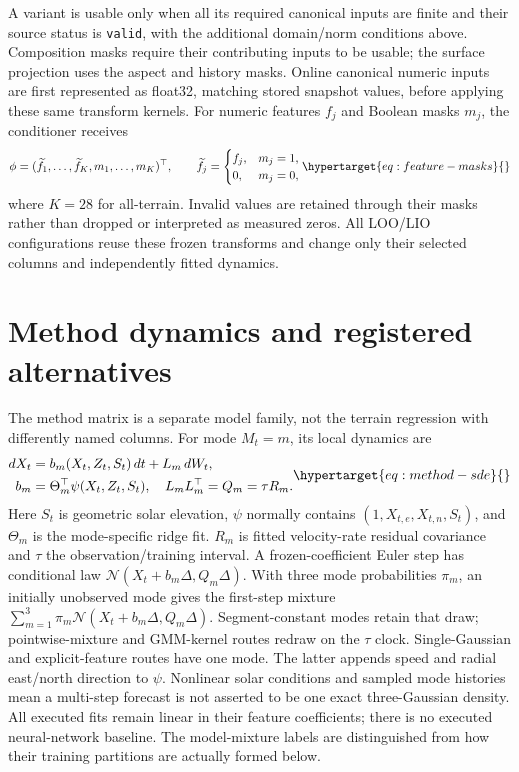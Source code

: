 A variant is usable only when all its required canonical inputs are finite
and their source status is \texttt{valid}, with the additional domain/norm
conditions above. Composition masks require their contributing inputs to be
usable; the surface projection uses the aspect and history masks. Online
canonical numeric inputs are first represented as float32, matching stored
snapshot values, before applying these same transform kernels. For numeric
features \(f_j\) and Boolean masks \(m_j\), the conditioner receives
\begin{equation}
 \phi=(\widetilde f_1,\ldots,\widetilde f_K,m_1,\ldots,m_K)^\top,
 \qquad \widetilde f_j=
 \begin{cases}f_j,&m_j=1,\\0,&m_j=0,\end{cases}
 \label{eq:feature-masks}\hypertarget{eq:feature-masks}{}
\end{equation}
where \(K=28\) for all-terrain. Invalid values are retained through their
masks rather than dropped or interpreted as measured zeros. All LOO/LIO
configurations reuse these frozen transforms and change only their selected
columns and independently fitted dynamics.


\section{Method dynamics and registered alternatives}
\label{sec:method-model}\hypertarget{sec:method-model}{}
The method matrix is a separate model family, not the terrain regression
with differently named columns. For mode \(M_t=m\), its local dynamics are
\begin{equation}
 \begin{aligned}
 dX_t&=b_m(X_t,Z_t,S_t)\,dt+L_m\,dW_t,\\
 b_m&=\Theta_m^\top\psi(X_t,Z_t,S_t),\quad L_mL_m^\top=Q_m=\tau R_m.
 \end{aligned}
 \label{eq:method-sde}\hypertarget{eq:method-sde}{}
\end{equation}
Here \(S_t\) is geometric solar elevation, \(\psi\) normally contains
\((1,X_{t,e},X_{t,n},S_t)\), and \(\Theta_m\) is the mode-specific ridge fit.
\(R_m\) is fitted velocity-rate residual covariance and \(\tau\) the
observation/training interval. A frozen-coefficient Euler step has conditional
law \(\mathcal N(X_t+b_m\Delta,Q_m\Delta)\).
With three mode probabilities \(\pi_m\), an initially unobserved mode gives
the first-step mixture \(\sum_{m=1}^3\pi_m\mathcal N(X_t+b_m\Delta,Q_m\Delta)\).
Segment-constant modes retain that draw; pointwise-mixture and GMM-kernel
routes redraw on the \(\tau\) clock. Single-Gaussian and explicit-feature
routes have one mode. The latter appends speed and radial east/north direction
to \(\psi\). Nonlinear solar conditions and sampled mode histories mean a
multi-step forecast is not asserted to be one exact three-Gaussian density.
All executed fits remain linear in their feature coefficients; there is no
executed neural-network baseline. The model-mixture labels are distinguished
from how their training partitions are actually formed below.

